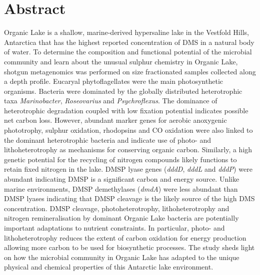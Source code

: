 \section{Abstract}
Organic Lake is a shallow, marine-derived hypersaline lake in the Vestfold Hills, Antarctica that has the highest reported concentration of \ac{DMS} in a natural body of water.
To determine the composition and functional potential of the microbial community and learn about the unusual sulphur chemistry in Organic Lake, shotgun metagenomics was performed on size fractionated samples collected along a depth profile.
Eucaryal phytoflagellates were the main photosynthetic organisms.
Bacteria were dominated by the globally distributed heterotrophic taxa \emph{Marinobacter}, \emph{Roseovarius} and \emph{Psychroflexus}.
The dominance of heterotrophic degradation coupled with low fixation potential indicates possible net carbon loss.
However, abundant marker genes for aerobic anoxygenic phototrophy, sulphur oxidation, rhodopsins and CO oxidation were also linked to the dominant heterotrophic bacteria and indicate use of photo- and lithoheterotrophy as mechanisms for conserving organic carbon.
Similarly, a high genetic potential for the recycling of nitrogen compounds likely functions to retain fixed nitrogen in the lake.
\ac{DMSP} lyase genes (\emph{dddD}, \emph{dddL} and \emph{dddP}) were abundant indicating \ac{DMSP} is a significant carbon and energy source.
Unlike marine environments, \ac{DMSP} demethylases (\emph{dmdA}) were less abundant than \ac{DMSP} lyases indicating that \ac{DMSP} cleavage is the likely source of the high \ac{DMS} concentration.
\ac{DMSP} cleavage, photoheterotrophy, lithoheterotrophy and nitrogen remineralisation by dominant Organic Lake bacteria are potentially important adaptations to nutrient constraints.
In particular, photo- and lithoheterotrophy reduces the extent of carbon oxidation for energy production allowing more carbon to be used for biosynthetic processes.
The study sheds light on how the microbial community in Organic Lake has adapted to the unique physical and chemical properties of this Antarctic lake environment.

\newpage

\acresetall
